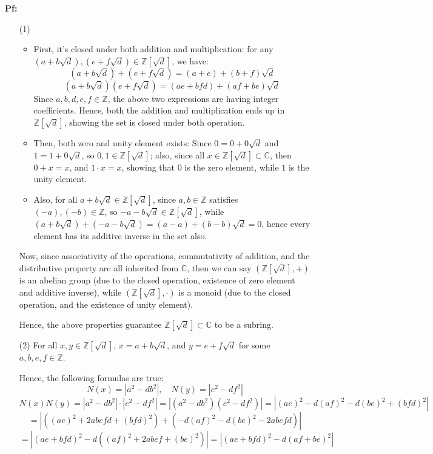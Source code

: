 \documentclass{article}
\begin{document}
\textbf{Pf:}

\begin{itemize}
    \item[(1)] \begin{itemize}
        \item First, it's closed under both addition and multiplication: for any $(a+b\sqrt{d}),(e+f\sqrt{d})\in \mathbb{Z}[\sqrt{d}]$, we have:
        $$(a+b\sqrt{d})+(e+f\sqrt{d})=(a+e)+(b+f)\sqrt{d}$$
        $$(a+b\sqrt{d})(e+f\sqrt{d})=(ae+bfd)+(af+be)\sqrt{d}$$
        Since $a,b,d,e,f\in\mathbb{Z}$, the above two expressions are having integer coefficients. Hence, both the addition and multiplication ends up in $\mathbb{Z}[\sqrt{d}]$,
        showing the set is closed under both operation.

        \item Then, both zero and unity element exists: Since $0=0+0\sqrt{d}$ and $1=1+0\sqrt{d}$, so $0,1\in\mathbb{Z}[\sqrt{d}]$;
        also, since all $x\in \mathbb{Z}[\sqrt{d}]\subset\mathbb{C}$, then $0+x = x$, and $1\cdot x = x$, showing that $0$ is the zero element,
        while $1$ is the unity element.

        \item Also, for all $a+b\sqrt{d}\in\mathbb{Z}[\sqrt{d}]$, since $a,b\in\mathbb{Z}$ satisfies $(-a),(-b)\in\mathbb{Z}$, so $-a-b\sqrt{d}\in\mathbb{Z}[\sqrt{d}]$,
        while $(a+b\sqrt{d})+(-a-b\sqrt{d})=(a-a)+(b-b)\sqrt{d}=0$, hence every element has its additive inverse in the set also.
    \end{itemize}

    Now, since associativity of the operations, commutativity of addition, and the distributive property are all inherited from $\mathbb{C}$,
    then we can say $(\mathbb{Z}[\sqrt{d}],+)$ is an abelian group (due to the closed operation, existence of zero element and additive inverse),
    while $(\mathbb{Z}[\sqrt{d}],\cdot)$ is a monoid (due to the closed operation, and the existence of unity element).

    Hence, the above properties guarantee $\mathbb{Z}[\sqrt{d}]\subset \mathbb{C}$ to be a subring.

    \hfil

    \item[(2)] For all $x,y\in\mathbb{Z}[\sqrt{d}]$, $x=a+b\sqrt{d}$, and $y=e+f\sqrt{d}$ for some $a,b,e,f\in\mathbb{Z}$.
    
    Hence, the following formulas are true:
    $$N(x)=|a^2-db^2|,\quad N(y)=|e^2-df^2|$$
    $$N(x)N(y)=|a^2-db^2|\cdot|e^2-df^2| = |(a^2-db^2)(e^2-df^2)| = |(ae)^2-d(af)^2-d(be)^2+(bfd)^2|$$
    $$= |((ae)^2+2abefd+(bfd)^2)+(-d(af)^2-d(be)^2-2abefd)|$$
    $$= |(ae+bfd)^2-d((af)^2+2abef+(be)^2)| = |(ae+bfd)^2-d(af+be)^2|$$


\end{itemize}
\end{document}
